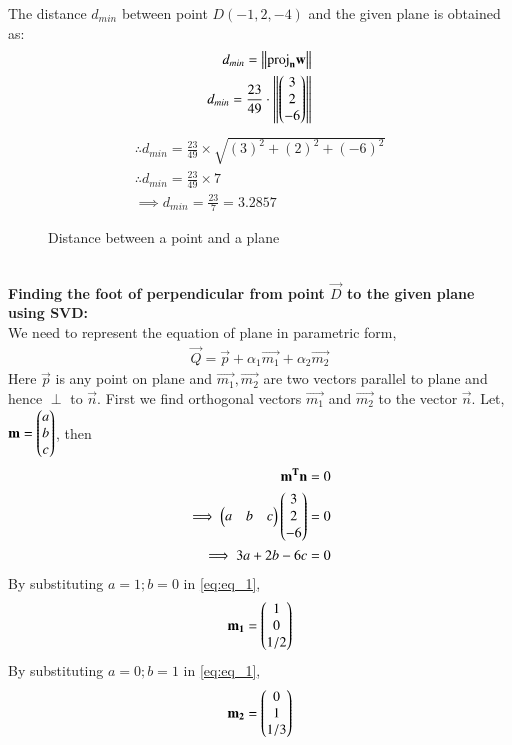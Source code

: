 \documentclass[journal,12pt,twocolumn]{IEEEtran}
\begin{document}
The distance $d_{min}$ between point $D(-1, 2, -4)$ and the given plane  is obtained as:
\begin{align}
    d_{min}=\left\lVert\text{proj}_\mathbf{n}\mathbf{w}\right\rVert\\
    d_{min}=\frac{23}{49}\cdot\left\lVert\begin{pmatrix}3\\2\\-6\end{pmatrix}\right\rVert
\end{align}
\begin{align}
    \therefore d_{min}=\frac{23}{49} \times \sqrt{(3)^2+(2)^2+(-6)^2}\\
    \therefore d_{min}=\frac{23}{49} \times 7\\
    \implies \boxed{d_{min}=\frac{23}{7}= 3.2857} \label{eq_20}
\end{align}
\begin{figure}[h!]
\centering
\resizebox{\columnwidth}{!}
    {
    
    }
    \caption{Distance between a point and a plane}
\end{figure}
\\
\textbf{Finding the foot of perpendicular from point $\vec{D}$ to the given plane using SVD:}\\
We need to represent the equation of plane in parametric form,
\begin{align}
	\vec{Q} = \vec{p} + \alpha_1\vec{m_1} + \alpha_2\vec{m_2}\label{eq3}
\end{align}
Here $\vec{p}$ is any point on plane and $\vec{m_1}, \vec{m_2}$ are two vectors parallel to plane and hence $\perp$ to $\vec{n}$.
First we find orthogonal vectors $\vec{m_1}$ and $\vec{m_2}$ to the vector $\vec{n}$. Let, $\mathbf{m} = \begin{pmatrix}a\\b\\c\end{pmatrix}$, then
\begin{align}
\mathbf{m^T}\mathbf{n} &= 0 \nonumber \\
\implies \begin{pmatrix}a & b & c\end{pmatrix} \begin{pmatrix}3 \\ 2 \\ -6\end{pmatrix} &= 0 \nonumber \\
\implies 3a+2b-6c &= 0 \label{eq:eq_1}
\end{align}
By substituting $a=1;b=0$ in \eqref{eq:eq_1},
\begin{align} \label{eq:eq_2}
    \mathbf{m_1} = \begin{pmatrix}1 \\ 0 \\ 1/2\end{pmatrix} 
\end{align}
By substituting $a=0;b=1$ in \eqref{eq:eq_1},
\begin{align} \label{eq:eq_3}
    \mathbf{m_2} = \begin{pmatrix}0 \\ 1 \\ 1/3\end{pmatrix} 
\end{align}
\end{document}
